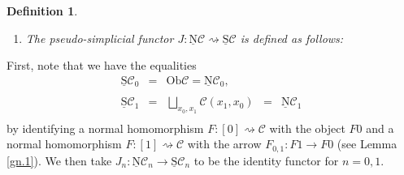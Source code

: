 \documentclass[]{amsart}
\newtheorem{definition}[theorem]{Definition}
\begin{document}
\begin{definition}
\begin{enumerate}
    \vspace{0.2cm}

\item[(v)] The pseudo-simplicial functor $J:{\ensuremath{\underline{\mathrm{N}}}}{\ensuremath{\mathcal{C}}}\rightsquigarrow \underline{\mathrm{S}}{\ensuremath{\mathcal{C}}}$  is defined as follows:

\end{enumerate}

\end{definition}
First, note that we have the equalities
$$
\begin{array}{cllll}
 \underline{\mathrm{S}}{\ensuremath{\mathcal{C}}}_0 & = & \mbox{Ob}{\ensuremath{\mathcal{C}}}= {\ensuremath{\underline{\mathrm{N}}}}{\ensuremath{\mathcal{C}}}_0,& &  \\
  &&&&\\
  \underline{\mathrm{S}}{\ensuremath{\mathcal{C}}}_1 & = & \bigsqcup\limits_{x_0,x_1}{\ensuremath{\mathcal{C}}}(x_1,x_0) & = & {\ensuremath{\underline{\mathrm{N}}}}{\ensuremath{\mathcal{C}}}_1 \\
\end{array}
$$
by identifying a normal homomorphism $F:[0]\rightsquigarrow{\ensuremath{\mathcal{C}}}$ with the object $F0$ and a normal
homomorphism $F:[1]\rightsquigarrow{\ensuremath{\mathcal{C}}}$ with the arrow $F_{0,1}:F1\to F0$ (see Lemma \ref{gn.1}). We
then take  $J_n:{\ensuremath{\underline{\mathrm{N}}}}{\ensuremath{\mathcal{C}}}_n\to \underline{\mathrm{S}}{\ensuremath{\mathcal{C}}}_n$  to be the identity functor for $n=0,1$.
\end{document}

